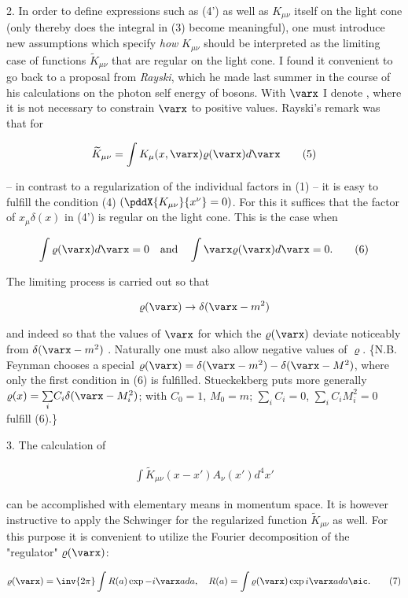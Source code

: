\documentclass{article}
\newcommand{\nequ}[2]{
\begin{align*}
#1
\tag{#2}
\end{align*}
}
\newcommand{\uequ}[1]{
\begin{align*}
#1
\end{align*}
}
\newcommand{\sumX}[1]{\underset{#1}{\sum}}
\begin{document}
2. In order to define expressions such as (4') as well as $K_{\mu\nu}$ itself on the light cone (only thereby does the integral in (3) become meaningful), one must introduce new assumptions which specify \textit{how} $K_{\mu\nu}$ should be interpreted as the limiting case of functions $\widetilde{K}_{\mu\nu}$ that are regular on the light cone.  I found it convenient to go back to a proposal from \textit{Rayski}, which he made last summer in the course of his calculations on the photon self energy of bosons. With $\varx$ I denote , where it is not necessary to constrain $\varx$ to positive values. Rayski's remark was that for
\nequ{
\widetilde{K}_{\mu\nu} = \int K_\mu (x, \varx)\varrho(\varx){d\varx}
}{5}
-- in contrast to a regularization of the individual factors in (1) -- it is easy to fulfill the condition (4) $\left(\pddX{K_{\mu\nu}}{x^\nu} = 0\right)$. For this it suffices that the factor of $x_\mu \delta(x)$ in (4') is regular on the light cone. This is the case when
\nequ{
\int\varrho(\varx){d\varx} = 0 \quad \text{and} \quad \int\varx\varrho(\varx){d\varx} = 0.
}{6}

The limiting process is carried out so that
\uequ{
\varrho(\varx) \to \delta(\varx - m^2)
}
and indeed so that the values of $\varx$ for which the $\varrho(\varx)$ deviate noticeably from $\delta(\varx - m^2)$ . Naturally one must also allow negative values of $\varrho$. \{N.B. Feynman chooses a special $\varrho(\varx) = \delta(\varx - m^2) - \delta(\varx - M^2)$, where only the first condition in (6) is fulfilled. Stueckekberg puts more generally $\varrho(x) = \sumX{i} C_i \delta(\varx - M_i^2)$; with $C_0=1$, $M_0=m$; $\sumX{i}C_i = 0$, $\sumX{i}C_i M_i^2 = 0$ fulfill (6).\}

3. The calculation of
\uequ{
\int\widetilde{K}_{\mu\nu}(x - x')A_\nu(x') {d^4 x'}
}
can be accomplished with elementary means in momentum space. It is however instructive to apply the Schwinger  for the regularized function $\widetilde{K}_{\mu\nu}$ as well. For this purpose it is convenient to utilize the Fourier decomposition of the "regulator" $\varrho(\varx)$:
\nequ{
\varrho(\varx) = \inv{2\pi}\int R(a)\exp{-i\varx a}{da},\quad
R(a) = \int\varrho(\varx)\exp{i\varx a}da\sic.
}{7}
\end{document}
